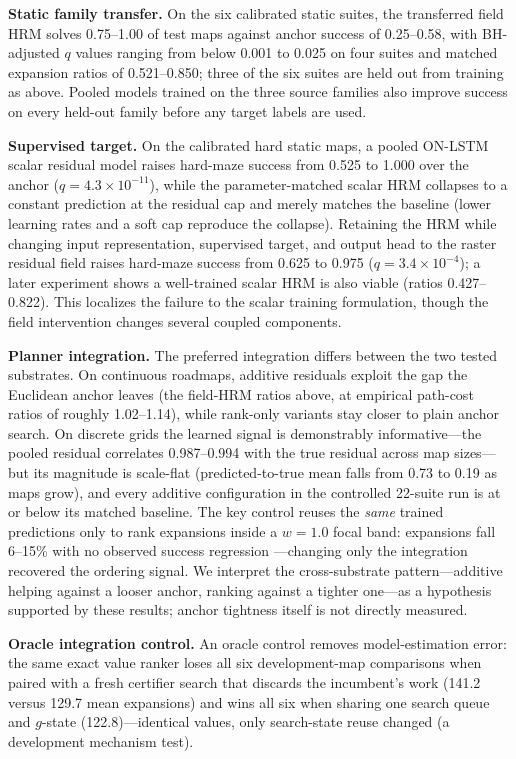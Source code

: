 \documentclass[letterpaper]{article} %
\begin{document}
\textbf{Static family transfer.} On the six calibrated static suites, the transferred field HRM solves 0.75--1.00 of test maps against anchor success of 0.25--0.58, with BH-adjusted $q$ values ranging from below 0.001 to 0.025 on four suites and matched expansion ratios of 0.521--0.850; three of the six suites are held out from training as above. Pooled models trained on the three source families also improve success on every held-out family before any target labels are used.

\textbf{Supervised target.} On the calibrated hard static maps, a pooled ON-LSTM scalar residual model raises hard-maze success from 0.525 to 1.000 over the anchor ($q=4.3\times10^{-11}$), while the parameter-matched scalar HRM collapses to a constant prediction at the residual cap and merely matches the baseline (lower learning rates and a soft cap reproduce the collapse). Retaining the HRM while changing input representation, supervised target, and output head to the raster residual field raises hard-maze success from 0.625 to 0.975 ($q=3.4\times10^{-4}$); a later experiment shows a well-trained scalar HRM is also viable (ratios 0.427--0.822). This localizes the failure to the scalar training formulation, though the field intervention changes several coupled components.

\textbf{Planner integration.} The preferred integration differs between the two tested substrates. On continuous roadmaps, additive residuals exploit the gap the Euclidean anchor leaves (the field-HRM ratios above, at empirical path-cost ratios of roughly 1.02--1.14), while rank-only variants stay closer to plain anchor search. On discrete grids the learned signal is demonstrably informative---the pooled residual correlates 0.987--0.994 with the true residual across map sizes---but its magnitude is scale-flat (predicted-to-true mean falls from 0.73 to 0.19 as maps grow), and every additive configuration in the controlled 22-suite run is at or below its matched baseline. The key control reuses the \emph{same} trained predictions only to rank expansions inside a $w{=}1.0$ focal band: expansions fall 6--15\% with no observed success regression \citep{chrestien2023rank}---changing only the integration recovered the ordering signal. We interpret the cross-substrate pattern---additive helping against a looser anchor, ranking against a tighter one---as a hypothesis supported by these results; anchor tightness itself is not directly measured.

\textbf{Oracle integration control.} An oracle control removes model-estimation error: the same exact value ranker loses all six development-map comparisons when paired with a fresh certifier search that discards the incumbent's work (141.2 versus 129.7 mean expansions) and wins all six when sharing one search queue and $g$-state (122.8)---identical values, only search-state reuse changed (a development mechanism test).
\end{document}
